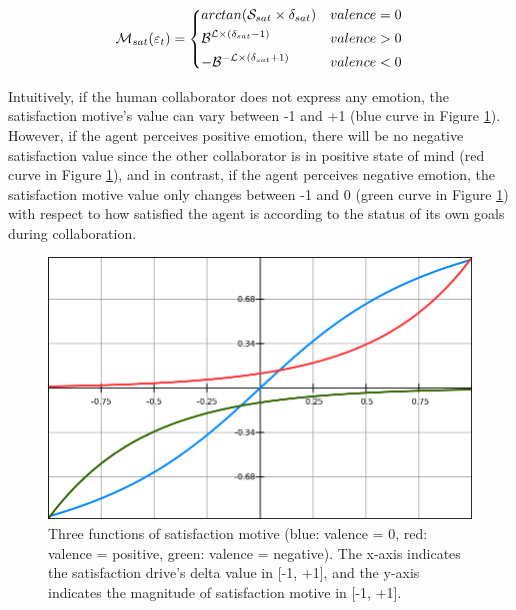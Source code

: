 \documentclass[12pt]{report}
\begin{document}
\begin{equation}
    \mathcal{M}_{sat}(\varepsilon_t)= 
    \begin{dcases}
       arctan (\mathcal{S}_{sat} \times \delta_{sat})      & valence = 0 \\
       \mathcal{B}^{\mathcal{L} \times (\delta_{sat}-1)}   & valence > 0 \\
       -\mathcal{B}^{-\mathcal{L} \times (\delta_{sat}+1)} & valence < 0
    \end{dcases}
    \label{eqn:satisfaction_motive}
\end{equation}

Intuitively, if the human collaborator does not express any emotion, the
satisfaction motive's value can vary between -1 and +1 (blue curve in Figure
\ref{fig:satisfaction-motive-functions}). However, if the agent perceives
positive emotion, there will be no negative satisfaction value since the other
collaborator is in positive state of mind (red curve in Figure
\ref{fig:satisfaction-motive-functions}), and in contrast, if the agent
perceives negative emotion, the satisfaction motive value only changes between
-1 and 0 (green curve in Figure \ref{fig:satisfaction-motive-functions}) with
respect to how satisfied the agent is according to the status of its own goals
during collaboration.

\begin{figure}[tbh]
  \centering
  \includegraphics[width=1\textwidth]{figure/satisfaction_motive_functions.png}
  \caption{Three functions of satisfaction motive (blue: valence = 0, red:
  valence = positive, green: valence = negative). The x-axis indicates the
  satisfaction drive's delta value in [-1, +1], and the y-axis indicates the
  magnitude of satisfaction motive in [-1, +1].}
  \label{fig:satisfaction-motive-functions}
\end{figure}
\end{document}
